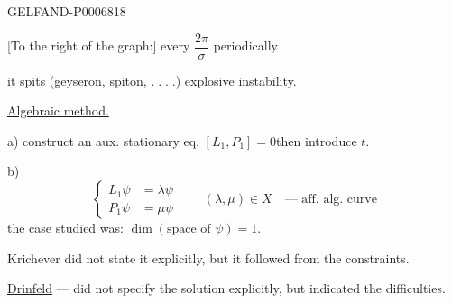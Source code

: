 \begin{GelfandAdjacentEvidence}{GELFAND-P000681}{8}


[To the right of the graph:] every \(\dfrac{2\pi}{\sigma}\) periodically
\end{GelfandAdjacentEvidence}

it spits
(geyseron, spiton, \(.\;.\;.\;.\))
explosive instability.

\underline{Algebraic method.}

a) construct an aux. stationary eq.
\([L_1,P_1]=0\)\qquad then introduce \(t\).

b)
\[
\left\{\begin{aligned}
L_1\psi&=\lambda\psi\\
P_1\psi&=\mu\psi
\end{aligned}\right.
\qquad
(\lambda,\mu)\in X\quad\text{--- aff. alg. curve}
\]
the case studied was: \underline{\(\dim(\text{space of }\psi)=1\)}.

Krichever did not state it explicitly, but it followed from the constraints.

\underline{Drinfeld} --- did not specify the solution explicitly, but indicated the difficulties.


